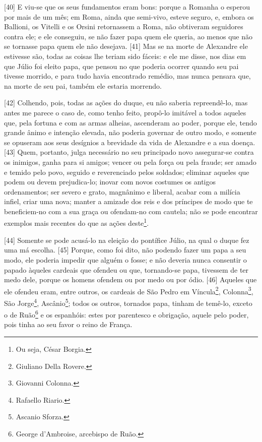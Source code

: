 {[}40{]} E viu-se que os seus fundamentos eram bons: porque a Romanha o
esperou por mais de um mês; em Roma, ainda que semi-vivo, esteve seguro,
e, embora os Ballioni, os Vitelli e os Orsini retornassem a Roma, não
obtiveram seguidores contra ele; e ele conseguiu, se não fazer papa quem
ele queria, ao menos que não se tornasse papa quem ele não desejava.
{[}41{]} Mas se na morte de Alexandre ele estivesse são, todas as coisas
lhe teriam sido fáceis: e ele me disse, nos dias em que Júlio  foi
eleito papa, que pensou no que poderia ocorrer quando seu pai tivesse
morrido, e para tudo havia encontrado remédio, mas nunca pensara que, na
morte de seu pai, também ele estaria morrendo.

{[}42{]} Colhendo, pois, todas as ações do duque, eu não saberia
repreendê-lo, mas antes me parece o caso de, como tenho feito, propô-lo
imitável a todos aqueles que, pela fortuna e com as armas alheias,
ascenderam ao poder, porque ele, tendo grande ânimo e intenção elevada,
não poderia governar de outro modo, e somente se opuseram aos seus
desígnios a brevidade da vida de Alexandre e a sua doença. {[}43{]}
Quem, portanto, julga necessário no seu principado novo assegurar-se
contra os inimigos, ganha para si amigos; vencer ou pela força ou pela
fraude; ser amado e temido pelo povo, seguido e reverenciado pelos
soldados; eliminar aqueles que podem ou devem prejudica-lo; inovar com
novos costumes os antigos ordenamentos; ser severo e grato, magnânimo e
liberal, acabar com a milícia infiel, criar uma nova; manter a amizade
dos reis e dos príncipes de modo que te beneficiem-no com a sua graça ou
ofendam-no com cautela; não se pode encontrar exemplos mais recentes do
que as ações deste\footnote{Ou seja, César Borgia.}.

{[}44{]} Somente se pode acusá-lo na eleição do pontífice Júlio, na qual
o duque fez uma má escolha. {[}45{]} Porque, como foi dito, não podendo
fazer um papa a seu modo, ele poderia impedir que alguém o fosse; e não
deveria nunca consentir o papado àqueles cardeais que ofendeu ou que,
tornando-se papa, tivessem de ter medo dele, porque os homens ofendem ou
por medo ou por ódio. {[}46{]} Aqueles que ele ofendeu eram, entre
outros, os cardeais de São Pedro em Víncula\footnote{Giuliano Della
  Rovere.}, Colonna\footnote{Giovanni Colonna.}, São Jorge\footnote{Rafaello
  Riario.}, Ascânio\footnote{Ascanio Sforza.}; todos os outros, tornados
papa, tinham de temê-lo, exceto o de Ruão\footnote{George d'Ambroise,
  arcebispo de Ruão.} e os espanhóis: estes por parentesco e obrigação,
aquele pelo poder, pois tinha ao seu favor o reino de França.

